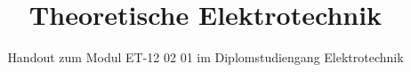 

\title[Theoretische Elektrotechnik]{Theoretische Elektrotechnik}

\subtitle{Handout zum Modul ET-12 02 01 im Diplomstudiengang Elektrotechnik}

% 
% 


% 
% 



